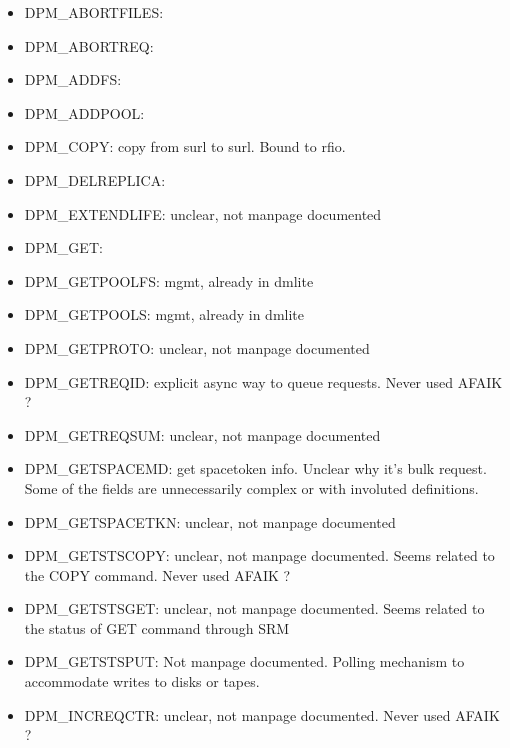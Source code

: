 \documentclass[a4paper,10pt]{scrreprt}
\begin{document}
\begin{itemize}
\item DPM\_ABORTFILES:

\item DPM\_ABORTREQ:

\item DPM\_ADDFS:

\item DPM\_ADDPOOL:

\item DPM\_COPY: copy from surl to surl. Bound to rfio.

\item DPM\_DELREPLICA:

\item DPM\_EXTENDLIFE: unclear, not manpage documented

\item DPM\_GET:

\item DPM\_GETPOOLFS: mgmt, already in dmlite

\item DPM\_GETPOOLS: mgmt, already in dmlite

\item DPM\_GETPROTO: unclear, not manpage documented

\item DPM\_GETREQID: explicit async way to queue requests. Never used AFAIK ?

\item DPM\_GETREQSUM:  unclear, not manpage documented

\item DPM\_GETSPACEMD: get spacetoken info. Unclear why it's bulk request. Some of the fields are unnecessarily complex or with involuted definitions.

\item DPM\_GETSPACETKN: unclear, not manpage documented

\item DPM\_GETSTSCOPY:  unclear, not manpage documented. Seems related to the COPY command. Never used AFAIK ?

\item DPM\_GETSTSGET: unclear, not manpage documented. Seems related to the status of GET command through SRM

\item DPM\_GETSTSPUT: Not manpage documented. Polling mechanism to accommodate writes to disks or tapes.

\item DPM\_INCREQCTR: unclear, not manpage documented. Never used AFAIK ?


\end{itemize}
\end{document}
